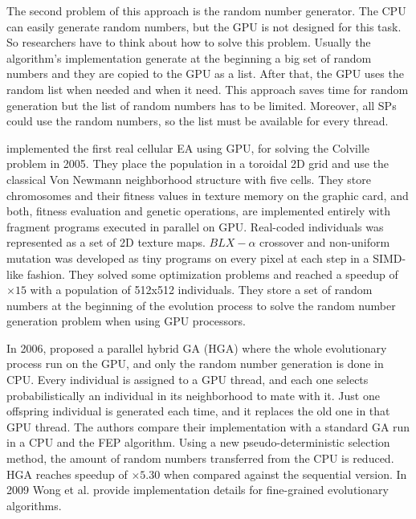 \documentclass[Afour,sageh,times]{sagej}
\begin{document}
The second problem of this approach is the random number generator. The CPU can easily generate random numbers, but the GPU is not designed for this task. So researchers have to think about how to solve this problem. Usually the algorithm's implementation generate at the beginning a big set of random numbers and they are copied to the GPU as a list. After that, the GPU uses the random list when needed and when it need. This approach saves time for random generation but the list of random numbers has to be limited. Moreover, all SPs could use the random numbers, so the list must be available for every thread. 


\cite{yu-parallel-2005} implemented the first real cellular EA using GPU, for solving the Colville problem \citep{Ng:2005:DFF:1064290.1064296} in 2005. They place the population in a toroidal 2D grid and use the classical Von Newmann neighborhood structure with five cells. They store chromosomes and their fitness values in texture memory on the graphic card, and both, fitness evaluation and genetic operations, are implemented entirely with fragment programs executed in parallel on GPU. Real-coded individuals was represented as a set of 2D texture maps. $BLX-\alpha$ crossover and non-uniform mutation was developed as tiny programs on every pixel at each step in a SIMD-like fashion. They solved some optimization problems and reached a speedup of $\times15$ with a population of 512x512 individuals. They store a set of random numbers at the beginning of the evolution process to solve the random number generation problem when using GPU processors. 

In 2006, \cite{man-leung-wong-parallel-2006} proposed a parallel hybrid GA (HGA) where the whole evolutionary process run on the GPU, and only the random number generation is done in CPU. Every individual is assigned to a GPU thread, and each one selects probabilistically an individual in its neighborhood to mate with it. Just one offspring individual is generated each time, and it replaces the old one in that GPU thread. The authors compare their implementation with a standard GA run in a CPU and the FEP \citep{man-leung-wong-parallel-2005} algorithm. Using a new pseudo-deterministic selection method, the amount of random numbers transferred from the CPU is reduced. HGA reaches speedup of $\times5.30$ when compared against the sequential version. In 2009 Wong et al. \citep{wong-implementation-2009} provide implementation details for fine-grained evolutionary algorithms.  
\end{document}
